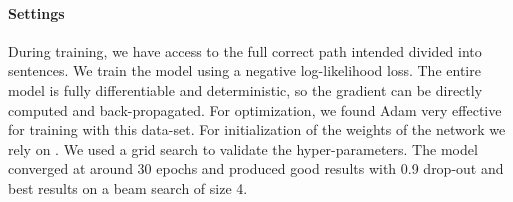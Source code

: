 \documentclass[11pt,a4paper]{article}
\begin{document}
\begin{table}[t]
\centering
{}
\caption{Baselines Results: Accuracy on Single Instructions and Stories}
\label{tab:baselines}
\end{table}


\begin{table}[t]
\centering
{}
\caption{Empirical Results: Accuracy of Single Instructions per Model}
\label{tab:results}
\end{table}


\paragraph{Settings}


 During training, we have access to the full correct path intended divided into sentences. We train the model using a negative log-likelihood loss. The entire model   is fully differentiable and deterministic, so the gradient can be directly computed and back-propagated.
For optimization, we found Adam \citep{kingma2014adam}
 very effective for training with this data-set. For initialization of the weights of the network we rely on  \citet{glorot2010understanding}. 
We used a grid search to validate the hyper-parameters. The model converged at around 30 epochs and produced good results with 0.9 drop-out and best results on a beam search of size 4.
\end{document}
